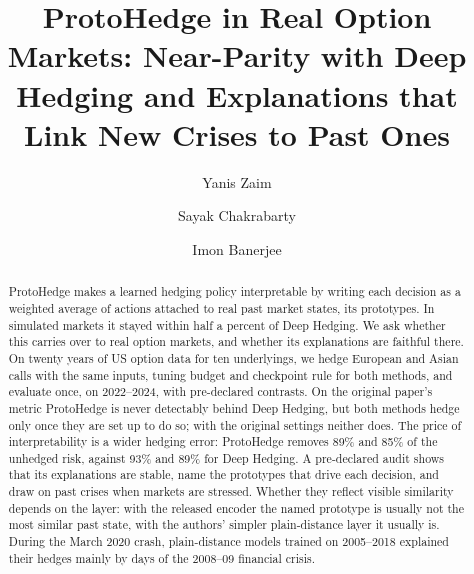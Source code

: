 \documentclass[runningheads]{llncs}
\begin{document}
\title{ProtoHedge in Real Option Markets: Near-Parity with Deep Hedging and Explanations that Link New Crises to Past Ones}

\author{Yanis Zaim \and Sayak Chakrabarty \and Imon Banerjee}

\maketitle

\begin{abstract}
ProtoHedge makes a learned hedging policy interpretable by writing each decision as a weighted average of
actions attached to real past market states, its prototypes. In simulated markets it stayed within half a
percent of Deep Hedging. We ask whether this carries over to real option markets, and whether its
explanations are faithful there. On twenty years of US option data for ten underlyings, we hedge European
and Asian calls with the same inputs, tuning budget and checkpoint rule for both methods, and evaluate once,
on 2022--2024, with pre-declared contrasts. On the original paper's metric ProtoHedge is never detectably
behind Deep Hedging, but both methods hedge only once they are set up to do so; with the original settings
neither does. The price of interpretability is a wider hedging error: ProtoHedge removes 89\% and 85\% of
the unhedged risk, against 93\% and 89\% for Deep Hedging. A pre-declared audit shows that its explanations
are stable, name the prototypes that drive each decision, and draw on past crises when markets are
stressed. Whether they reflect visible similarity depends on the layer: with the released encoder the named
prototype is usually not the most similar past state, with the authors' simpler plain-distance layer it
usually is. During the March 2020 crash, plain-distance models trained on 2005--2018 explained their hedges mainly by
days of the 2008--09 financial crisis.

\end{abstract}
\end{document}
